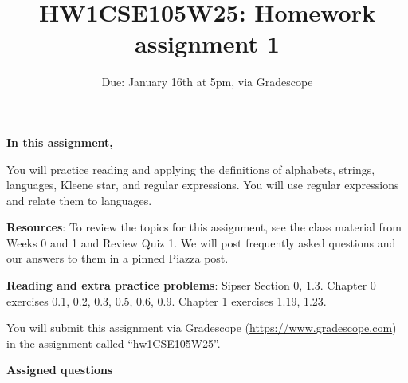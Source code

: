 

\title{HW1CSE105W25: Homework assignment 1}
\date{Due: January 16th at 5pm, via Gradescope}



\maketitle
\thispagestyle{fancy}

{\bf In this assignment,}

You will practice reading and
applying the definitions of alphabets, strings, languages, Kleene star, and regular expressions.
You will use regular expressions and relate them to languages.


{\bf Resources}: To review the topics 
for this assignment, see the class material from Weeks 0 and 1 and Review Quiz 1.
We will post frequently asked questions and our answers to them in a 
pinned Piazza post.

{\bf Reading and extra practice problems}: Sipser Section 0, 1.3.
Chapter 0 exercises 0.1, 0.2, 0.3, 0.5, 0.6, 0.9. Chapter 1 exercises 1.19, 1.23.

\instructions

You will submit this assignment via Gradescope
(\href{https://www.gradescope.com}{https://www.gradescope.com}) 
in the assignment called ``hw1CSE105W25''.

{\bf Assigned questions}


